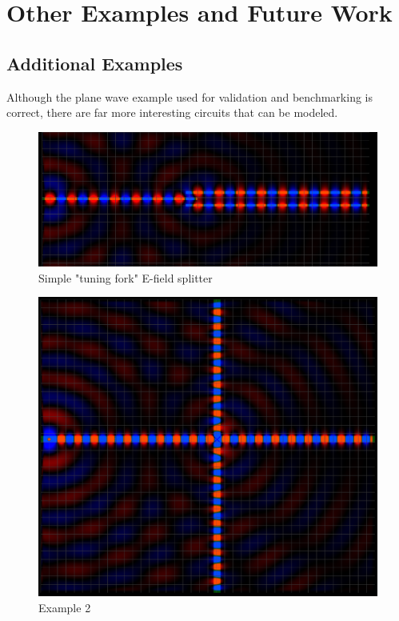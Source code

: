 \chapter{Other Examples and Future Work} \label{ch:futurework}

\section{Additional Examples}

Although the plane wave example used for validation and benchmarking is correct, there are far more interesting circuits that can be modeled. 

\begin{figure}[H]
	\centering
	\includegraphics[width=\textwidth,
	keepaspectratio]{example1.png}
	\caption{Simple "tuning fork" E-field splitter}
	\label{fig:example1}
\end{figure}


\begin{figure}[H]
	\centering
	\includegraphics[width=\textwidth,
	keepaspectratio]{example2.png}
	\caption{Example 2}
	\label{fig:example2}
\end{figure}


